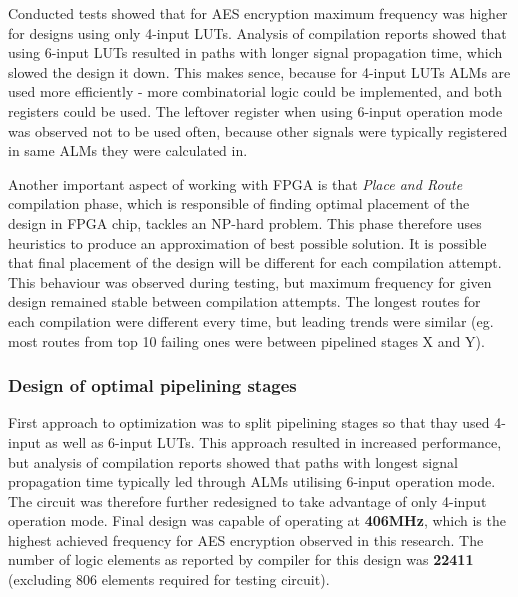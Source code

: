 Conducted tests showed that for AES encryption maximum frequency was higher for designs using only 4-input LUTs. Analysis of compilation reports showed that using 6-input LUTs resulted in paths with longer signal propagation time, which slowed the design it down. This makes sence, because for 4-input LUTs ALMs are used more efficiently - more combinatorial logic could be implemented, and both registers could be used. The leftover register when using 6-input operation mode was observed not to be used often, because other signals were typically registered in same ALMs they were calculated in.

Another important aspect of working with FPGA is that \textit{Place and Route} compilation phase, which is responsible of finding optimal placement of the design in FPGA chip, tackles an NP-hard problem. This phase therefore uses heuristics to produce an approximation of best possible solution. It is possible that final placement of the design will be different for each compilation attempt. This behaviour was observed during testing, but maximum frequency for given design remained stable between compilation attempts. The longest routes for each compilation were different every time, but leading trends were similar (eg. most routes from top 10 failing ones were between pipelined stages X and Y).




\subsubsection{Design of optimal pipelining stages}
\label{sec:pipeline-stages-design}

First approach to optimization was to split pipelining stages so that thay used 4-input as well as 6-input LUTs. This approach resulted in increased performance, but analysis of compilation reports showed that paths with longest signal propagation time typically led through ALMs utilising 6-input operation mode. The circuit was therefore further redesigned to take advantage of only 4-input operation mode. Final design was capable of operating at \textbf{406MHz}, which is the highest achieved frequency for AES encryption observed in this research. The number of logic elements as reported by compiler for this design was \textbf{22411} (excluding 806 elements required for testing circuit).


